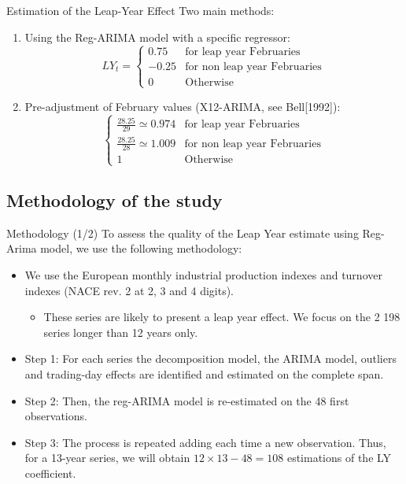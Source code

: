 \documentclass[10pt]{beamer}
\begin{document}
\begin{frame}{Estimation of the Leap-Year Effect}
Two main methods:
\begin{enumerate}
\item<1-> Using the Reg-ARIMA model with a specific regressor:
\[
LY_t = \begin{cases}
0.75 & \text{for leap year Februaries} \\
-0.25  & \text{for non leap year Februaries} \\
0 & \text{Otherwise}
\end{cases}
\]
\item<2-> Pre-adjustment of February values (X12-ARIMA, see Bell[1992]): 
\[\begin{cases}
\frac{28.25}{29} \simeq 0.974 & \text{for leap year Februaries} \\
\frac{28.25}{28} \simeq 1.009 & \text{for non leap year Februaries} \\
1 & \text{Otherwise}
\end{cases}
\]
\end{enumerate}
\end{frame}

\subsection{Methodology of the study}
\begin{frame}{Methodology (1/2)}
To assess the quality of the Leap Year estimate using Reg-Arima model, we use the following methodology:
\begin{itemize}
	\item We use the European monthly industrial production indexes and turnover indexes (NACE rev. 2 at 2, 3 and 4 digits).
		\begin{itemize}
		  \item These series are likely to present a leap year effect. We focus on the 2 198 series longer than 12 years only.
	  \end{itemize}
	\item Step 1: For each series the decomposition model, the ARIMA model, outliers and trading-day effects are identified and estimated on the complete span.
	\item Step 2: Then, the reg-ARIMA model is re-estimated on the 48 first observations.
	\item Step 3: The process is repeated adding each time a new observation. Thus, for a 13-year series, we will obtain $12 \times 13 - 48 = 108$ estimations of the LY coefficient.
\end{itemize}
\end{frame}
\end{document}
